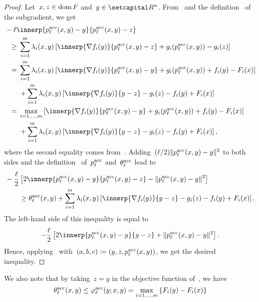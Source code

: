 \documentclass[../main]{subfiles}
\begin{document}
\begin{proof}
    Let~$x, z \in \operatorname{dom} F$ and~$y \in \setR^n$.
    From~ and the definition~ of the subgradient, we get
    \begin{align}
        \MoveEqLeft - \ell \innerp{p^\acc_\ell(x, y) - y}{p^\acc_\ell(x, y) - z} \\
        \ge{}& \sum_{i = 1}^{m} \lambda_i(x, y) \left[ \innerp{\nabla f_i(y)}{p^\acc_\ell(x, y) - z} + g_i(p^\acc_\ell(x, y)) - g_i(z) \right] \\
        ={}& \sum_{i = 1}^{m} \lambda_i(x, y) \left[ \innerp{\nabla f_i(y)}{p^\acc_\ell(x, y) - y} + g_i(p^\acc_\ell(x, y)) + f_i(y) - F_i(x) \right] \\
         &+ \sum_{i = 1}^{m} \lambda_i(x, y) \left[ \innerp{\nabla f_i(y)}{y - z} - g_i(z) - f_i(y) + F_i(x) \right] \\
        ={}& \max_{i = 1, \dots, m} \left[ \innerp{\nabla f_i(y)}{p^\acc_\ell(x, y) - y} + g_i(p^\acc_\ell(x, y)) + f_i(y) - F_i(x) \right] \\
         &+ \sum_{i = 1}^{m} \lambda_i(x, y) \left[ \innerp{\nabla f_i(y)}{y - z} - g_i(z) - f_i(y) + F_i(x) \right]
    ,\end{align}
    where the second equality comes from~.
    Adding~$(\ell / 2) \lVert p^{\mathrm{acc}}_\ell(x, y) - y\rVert^2$ to both sides and the definition~ of~$p^{\mathrm{acc}}_\ell$ and~$\theta^{\mathrm{acc}}_\ell$ lead to
    \begin{align}
        \MoveEqLeft - \frac{\ell}{2} \left[ 2 \innerp{p^\acc_\ell(x, y) - y}{p^\acc_\ell(x, y) - z} - \norm{p^\acc_\ell(x, y) - y}^2 \right] \\
        &\ge \theta^\acc_\ell(x, y) + \sum_{i = 1}^{m} \lambda_i(x, y) \left[ \innerp{\nabla f_i(y)}{y - z} - g_i(z) - f_i(y) + F_i(x) \right]
    .\end{align}
    The left-hand side of this inequality is equal to
    \begin{equation}
        - \frac{\ell}{2} \left[ 2 \innerp{p^\acc_\ell(x, y) - y}{y - z} + \norm{p^\acc_\ell(x, y) - y}^2 \right]
    .\end{equation}
    Hence, applying~ with~$(a, b, c) \coloneqq (y, z, p^{\mathrm{acc}}_\ell(x, y))$, we get the desired inequality.
\end{proof}
We also note that by taking~$z = y$ in the objective function of~, we have
\begin{equation} \label{eq:acc prox subprob optimality}
    \theta^{\mathrm{acc}}_\ell(x, y) \le \varphi^{\mathrm{acc}}_\ell(y; x, y) = \max_{i = 1, \dots, m}\left\{ F_i(y) - F_i(x) \right\}
\end{equation}
\end{document}
